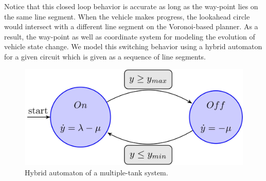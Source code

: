 
Notice that this closed loop behavior is accurate as long as the way-point lies on the same line segment.
%
When the vehicle makes progress, the lookahead circle would intersect with a different line segment on the Voronoi-based planner.
%
As a result, the way-point as well as coordinate system for modeling the evolution of vehicle state change.
%
We model this switching behavior using a hybrid automaton for a given circuit which is given as a sequence of line segments.

\begin{figure}
\centering
\includegraphics[width=0.8\linewidth]{Figures/hybrid-automaton.jpeg}
\caption{Hybrid automaton of a multiple-tank system.}
\label{fig:ha}
\end{figure}

